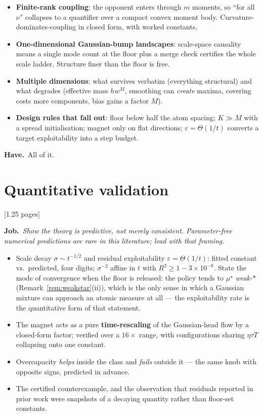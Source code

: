 \documentclass[11pt]{article}
\newcommand{\job}[1]{\par\smallskip\noindent
  \textcolor{jobc}{\textbf{Job.}}\ \emph{#1}\par\smallskip}
\newcommand{\have}[1]{\par\noindent
  \textcolor{havec}{\textbf{Have.}}\ #1\par}
\newcommand{\budget}[1]{\hfill{\small\textsf{[#1]}}}
\theoremstyle{definition}
\theoremstyle{remark}
\begin{document}
\begin{itemize}[leftmargin=1.2em]
\item \textbf{Finite-rank coupling}: the opponent enters through $m$ moments, so
  ``for all $\nu$'' collapses to a quantifier over a compact convex moment body.
  Curvature-dominates-coupling in closed form, with worked constants.
\item \textbf{One-dimensional Gaussian-bump landscapes}: scale-space causality
  means a single mode count at the floor plus a merge check certifies the whole
  scale ladder. Structure finer than the floor is free.
\item \textbf{Multiple dimensions}: what survives verbatim (everything
  structural) and what degrades (effective mass $h w^M$, smoothing can
  \emph{create} maxima, covering costs more components, bias gains a factor $M$).
\item \textbf{Design rules that fall out}: floor below half the atom spacing;
  $K \gg M$ with a spread initialisation; magnet only on flat directions;
  $\varepsilon = \Theta(1/t)$ converts a target exploitability into a step budget.
\end{itemize}

\have{All of it.}

\section{Quantitative validation}\label{sec:valid}
\budget{1.25 pages}

\job{Show the theory is \emph{predictive}, not merely consistent. Parameter-free
numerical predictions are rare in this literature; lead with that framing.}

\begin{itemize}[leftmargin=1.2em]
\item Scale decay $\sigma \sim t^{-1/2}$ and residual exploitability
  $\varepsilon = \Theta(1/t)$: fitted constant vs.\ predicted, four digits;
  $\sigma^{-2}$ affine in $t$ with $R^2 \ge 1-3\times10^{-8}$. State the mode of
  convergence when the floor is released: the policy tends to $\mu^\star$
  \emph{weak-$*$} (Remark~\ref{rem:weakstar}(ii)), which is the only sense in
  which a Gaussian mixture can approach an atomic measure at all --- the
  exploitability rate is the quantitative form of that statement.
\item The magnet acts as a pure \textbf{time-rescaling} of the Gaussian-head flow
  by a closed-form factor; verified over a $16\times$ range, with configurations
  sharing $\eta\tau T$ collapsing onto one constant.
\item Overcapacity \emph{helps} inside the class and \emph{fails} outside it ---
  the same knob with opposite signs, predicted in advance.
\item The certified counterexample, and the observation that residuals reported
  in prior work were snapshots of a decaying quantity rather than floor-set
  constants.
\end{itemize}
\end{document}
